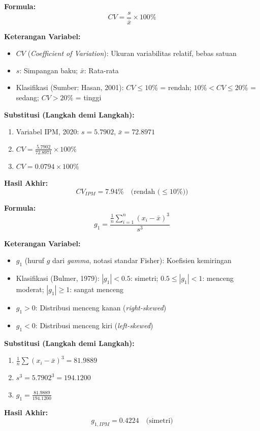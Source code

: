 \documentclass[11pt,a4paper]{article}
\begin{document}
\begin{tcolorbox}[formula_box, title={7. Koefisien Variasi / \textit{Coefficient of Variation} (CV)}]
\textbf{Formula:}
\[ CV = \frac{s}{\bar{x}} \times 100\% \]

\textbf{Keterangan Variabel:}
\begin{itemize}
  \item $CV$ (\textit{Coefficient of Variation}): Ukuran variabilitas relatif, bebas satuan
  \item $s$: Simpangan baku; $\bar{x}$: Rata-rata
  \item Klasifikasi (Sumber: Hasan, 2001): $CV \leq 10\%$ = rendah; $10\% < CV \leq 20\%$ = sedang; $CV > 20\%$ = tinggi
\end{itemize}

\textbf{Substitusi (Langkah demi Langkah):}
\begin{enumerate}
  \item Variabel IPM, 2020: $s = 5.7902$, $\bar{x} = 72.8971$
  \item $CV = \frac{5.7902}{72.8971} \times 100\%$
  \item $CV = 0.0794 \times 100\%$
\end{enumerate}

\textbf{Hasil Akhir:}
\[ CV_{IPM} = 7.94\% \quad \text{(rendah ($\leq 10\%$))} \]
\end{tcolorbox}

\begin{tcolorbox}[formula_box, title={8. Koefisien Kemiringan / \textit{Skewness} ($g_1$)}]
\textbf{Formula:}
\[ g_1 = \frac{\frac{1}{n}\sum_{i=1}^{n}(x_i-\bar{x})^3}{s^3} \]

\textbf{Keterangan Variabel:}
\begin{itemize}
  \item $g_1$ (huruf $g$ dari \textit{gamma}, notasi standar Fisher): Koefisien kemiringan
  \item Klasifikasi (Bulmer, 1979): $|g_1| < 0.5$: simetri; $0.5 \leq |g_1| < 1$: menceng moderat; $|g_1| \geq 1$: sangat menceng
  \item $g_1 > 0$: Distribusi menceng kanan (\textit{right-skewed})
  \item $g_1 < 0$: Distribusi menceng kiri (\textit{left-skewed})
\end{itemize}

\textbf{Substitusi (Langkah demi Langkah):}
\begin{enumerate}
  \item $\frac{1}{n}\sum(x_i-\bar{x})^3 = 81.9889$
  \item $s^3 = 5.7902^3 = 194.1200$
  \item $g_1 = \frac{81.9889}{194.1200}$
\end{enumerate}

\textbf{Hasil Akhir:}
\[ g_{1,IPM} = 0.4224 \quad \text{(simetri)} \]
\end{tcolorbox}
\end{document}

